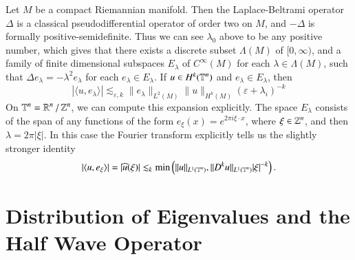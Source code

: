 \begin{example}
    Let $M$ be a compact Riemannian manifold. Then the Laplace-Beltrami operator $\Delta$ is a classical pseudodifferential operator of order two on $M$, and $-\Delta$ is formally positive-semidefinite. Thus we can see $\lambda_0$ above to be any positive number, which gives that there exists a discrete subset $\Lambda(M)$ of $[0,\infty)$, and a family of finite dimensional subspaces $E_\lambda$ of $C^\infty(M)$ for each $\lambda \in \Lambda(M)$, such that $\Delta e_\lambda = - \lambda^2 e_\lambda$ for each $e_\lambda \in E_\lambda$. If $u \in H^k(\operatorname{\mathbb{T}}^n)$ and $e_\lambda \in E_\lambda$, then
    \[ |\langle u, e_\lambda \rangle| \lesssim_{\varepsilon,k} \| e_\lambda \|_{L^2(M)} \| u \|_{H^k(M)} (\varepsilon + \lambda_i)^{-k} \]
    On $\operatorname{\mathbb{T}}^n = \operatorname{\mathbb{R}}^n / \operatorname{\mathbb{Z}}^n$, we can compute this expansion explicitly. The space $E_\lambda$ consists of the span of any functions of the form $e_\xi(x) = e^{2 \pi i \xi \cdot x}$, where $\xi \in \operatorname{\mathbb{Z}}^n$, and then $\lambda = 2 \pi |\xi|$. In this case the Fourier transform explicitly tells us the slightly stronger identity
    \[ |\langle u, e_\xi \rangle| = |\widehat{u}(\xi)| \lesssim_k \min \left( \| u \|_{L^1(\operatorname{\mathbb{T}}^n)}, \| D^k u \|_{L^1(\operatorname{\mathbb{T}}^n)} |\xi|^{-k} \right). \]
\end{example}







\chapter{Distribution of Eigenvalues and the Half Wave Operator}

